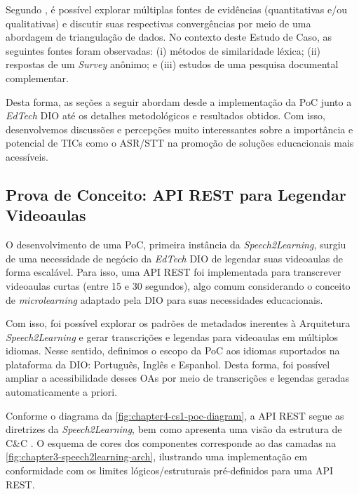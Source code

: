 Segundo \cite{Farquhar2020}, é possível explorar múltiplas fontes de evidências (quantitativas e/ou qualitativas) e discutir suas respectivas convergências por meio de uma abordagem de triangulação de dados. No contexto deste Estudo de Caso, as seguintes fontes foram observadas: (i) métodos de similaridade léxica; (ii) respostas de um \textit{Survey} anônimo; e (iii) estudos de uma pesquisa documental complementar.

Desta forma, as seções a seguir abordam desde a implementação da PoC junto a \textit{EdTech} DIO até os detalhes metodológicos e resultados obtidos. Com isso, desenvolvemos discussões e percepções muito interessantes sobre a importância e potencial de TICs como o ASR/STT na promoção de soluções educacionais mais acessíveis.

\subsection{Prova de Conceito: API REST para Legendar Videoaulas}

O desenvolvimento de uma PoC, primeira instância da \textit{Speech2Learning}, surgiu de uma necessidade de negócio da \textit{EdTech} DIO de legendar suas videoaulas de forma escalável. Para isso, uma API REST foi implementada para transcrever videoaulas curtas (entre 15 e 30 segundos), algo comum considerando o conceito de \textit{microlearning} adaptado pela DIO para suas necessidades educacionais. 

Com isso, foi possível explorar os padrões de metadados inerentes à Arquitetura \textit{Speech2Learning} e gerar transcrições e legendas para videoaulas em múltiplos idiomas. Nesse sentido, definimos o escopo da PoC aos idiomas suportados na plataforma da DIO: Português, Inglês e Espanhol. Desta forma, foi possível ampliar a acessibilidade desses OAs por meio de transcrições e legendas geradas automaticamente a priori.

Conforme o diagrama da \autoref{fig:chapter4-cs1-poc-diagram}, a API REST segue as diretrizes da \textit{Speech2Learning}, bem como apresenta uma visão da estrutura de C\&C \cite{Bass2021}. O esquema de cores dos componentes corresponde ao das camadas na \autoref{fig:chapter3-speech2learning-arch}, ilustrando uma implementação em conformidade com os limites lógicos/estruturais pré-definidos para uma API REST.

